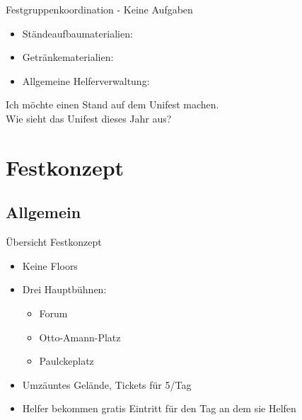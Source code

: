\begin{frame}[c]{Festgruppenkoordination - Keine Aufgaben}
    \begin{itemize}[<+(1)->]
        \item Ständeaufbaumaterialien: 
        \item Getränkematerialien: 
        \item Allgemeine Helferverwaltung: 
    \end{itemize}
\end{frame}


\begin{frame}[standout]
    Ich möchte einen Stand auf dem Unifest machen. \\
    Wie sieht das Unifest dieses Jahr aus?
\end{frame}


\section{Festkonzept}

\subsection{Allgemein}

\begin{frame}[c]{Übersicht Festkonzept}
    \begin{itemize}[<+(1)->]
        \item Keine Floors
        \item Drei Hauptbühnen:
            \begin{itemize}[<+(1)->]
                \item Forum
                \item Otto-Amann-Platz
                \item Paulckeplatz
            \end{itemize}
        \item Umzäuntes Gelände, Tickets für 5\EUR/Tag
        \item Helfer bekommen gratis Eintritt für den Tag an dem sie Helfen
    \end{itemize}
\end{frame}



